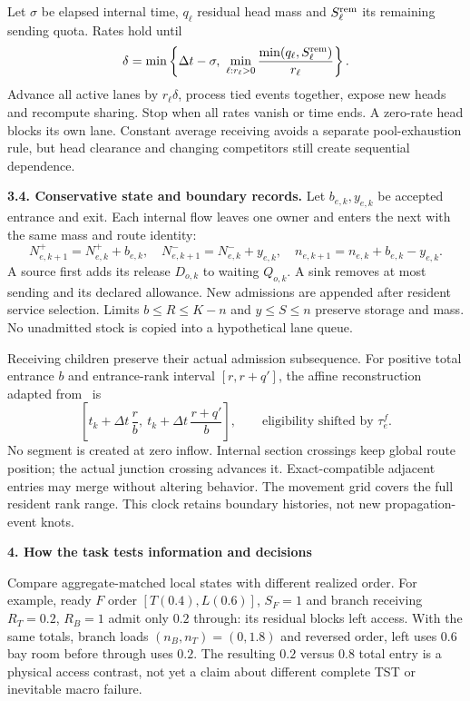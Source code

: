 \documentclass[10pt,a4paper]{article}
\newcommand{\head}[1]{\par\vspace{4pt}\noindent\textbf{#1}\par\nobreak\vspace{1pt}}
\begin{document}
Let $\sigma$ be elapsed internal time, $q_\ell$ residual head mass and
$S_\ell^{\rm rem}$ its remaining sending quota. Rates hold until
\begin{equation}
 \delta=\min\left\{\Delta t-\sigma,\
 \min_{\ell:r_\ell>0}
       \frac{\min(q_\ell,S_\ell^{\rm rem})}{r_\ell}\right\}.
 \label{eq:compact-head-time}
\end{equation}
Advance all active lanes by $r_\ell\delta$, process tied events together,
expose new heads and recompute sharing. Stop when all rates vanish or
time ends. A zero-rate head blocks its own lane. Constant average
receiving avoids a separate pool-exhaustion rule, but head clearance
and changing competitors still create sequential dependence.

\textbf{3.4. Conservative state and boundary records.}
Let $b_{e,k},y_{e,k}$ be accepted entrance and exit. Each internal flow
leaves one owner and enters the next with the same mass and route identity:
\begin{equation}
 N^+_{e,k+1}=N^+_{e,k}+b_{e,k},\quad
 N^-_{e,k+1}=N^-_{e,k}+y_{e,k},\quad
 n_{e,k+1}=n_{e,k}+b_{e,k}-y_{e,k}.
 \label{eq:compact-update}
\end{equation}
A source first adds its release $D_{o,k}$ to waiting $Q_{o,k}$.
A sink removes at most sending and its declared allowance.
New admissions are appended after resident service selection.
Limits $b\leq R\leq K-n$ and $y\leq S\leq n$ preserve storage and mass.
No unadmitted stock is copied into a hypothetical lane queue.

Receiving children preserve their actual admission subsequence.
For positive total entrance $b$ and entrance-rank interval $[r,r+q']$,
the affine reconstruction adapted from~\cite{m1} is
\begin{equation}
 \left[t_k+\Delta t\,\frac r b,\
       t_k+\Delta t\,\frac{r+q'}b\right],
 \qquad\text{eligibility shifted by }\tau^f_e .
 \label{eq:compact-entry}
\end{equation}
No segment is created at zero inflow. Internal section crossings keep
global route position; the actual junction crossing advances it.
Exact-compatible adjacent entries may merge without altering behavior.
The movement grid covers the full resident rank range.
This clock retains boundary histories, not new propagation-event knots.

\head{4. How the task tests information and decisions}
Compare aggregate-matched local states with different realized order.
For example, ready $F$ order $[T(0.4),L(0.6)]$, $S_F=1$ and branch
receiving $R_T=0.2$, $R_B=1$ admit only $0.2$ through: its residual
blocks left access. With the same totals, branch loads $(n_B,n_T)=(0,1.8)$
and reversed order, left uses $0.6$ bay room before through uses $0.2$.
The resulting $0.2$ versus $0.8$ total entry is a physical access contrast,
not yet a claim about different complete TST or inevitable macro failure.
\end{document}
